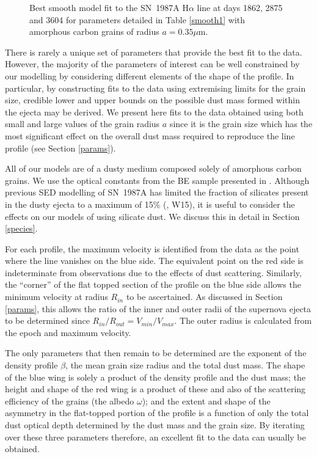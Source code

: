 \documentclass[useAMS,usenatbib,usegraphicx]{mnras}
\begin{document}
\begin{figure}
\begin{center}
\caption{Best smooth model fit to the SN~1987A H$\alpha$ line at days 1862, 2875 and 
3604 for parameters detailed in Table \ref{smooth1} with amorphous carbon grains of radius $a=0.35 \mu$m.}
\label{d1862_3604}
\end{center}
\end{figure}


There is rarely a unique set of parameters that provide the best fit to the data.  However, the 
majority of the parameters of interest can be well constrained by our 
modelling by considering different elements of the shape of the profile.  In particular, by constructing fits to 
the data using extremising limits for the grain 
size, credible lower and upper bounds on the possible dust mass formed 
within the ejecta may be derived.  We present here
 fits to the data obtained using both small and large values of the grain radius $a$ since it is the grain size which has the most significant effect on the overall 
dust mass required to reproduce the line profile (see Section \ref{params}).  

All of our models are of a dusty medium composed solely of amorphous carbon grains. We use the optical 
constants from the BE sample presented in \citet{Zubko1996}.    Although previous SED modelling of SN~1987A has limited the fraction of silicates present in the dusty ejecta to a maximum of 15\% (\citet{Ercolano2007}, W15), it is useful to consider the effects on our models of using silicate dust.  We discuss this in detail in Section \ref{species}.

For each profile, the maximum velocity is identified from the data as the 
point where the line vanishes on the blue side.  The equivalent point on 
the red side is indeterminate from observations due to the effects of 
dust scattering.  Similarly, the ``corner'' of the flat topped section of the 
profile on the blue side allows the minimum velocity at radius $R_{in}$ to be 
ascertained. As discussed in Section \ref{params}, this allows the ratio 
of the inner and outer radii of the supernova ejecta to be determined since 
$R_{in}/R_{out}=V_{min}/V_{max}$.  The outer radius is calculated from the 
epoch and maximum velocity.

The only parameters that then remain to be determined are the exponent of 
the density profile $\beta$, the mean grain size radius and the total dust mass.  The shape 
of the blue wing is solely a product of the density profile and the dust 
mass; the height and shape of the red wing is a product of these and also 
of the scattering efficiency of the grains (the albedo $\omega$); and the 
extent and shape of the asymmetry in the flat-topped portion of the 
profile is a function of only the total dust optical depth determined by the 
dust mass and the grain size.  By iterating over these three parameters 
therefore, an excellent fit to the data can usually be obtained.
\end{document}

